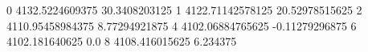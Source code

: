 0 4132.5224609375 30.3408203125
1 4122.71142578125 20.52978515625
2 4110.95458984375 8.77294921875
4 4102.06884765625 -0.11279296875
6 4102.181640625 0.0
8 4108.416015625 6.234375
